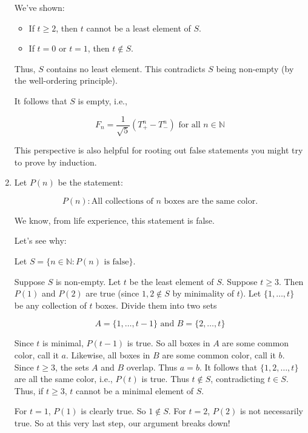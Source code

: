 \documentclass[11pt, draft]{article}
\begin{document}
\begin{enumerate}
          We've shown:
          \begin{itemize}
              \item If $t \geq 2$, then $t$ cannot be a least element of $S$.
              \item If $t = 0$ or $t = 1$, then $t \notin S$.
          \end{itemize}

          Thus, $S$ contains no least element. This contradicts $S$ being non-empty (by
          the well-ordering principle).

          It follows that $S$ is empty, i.e.,

          \[
              F_n = \frac{1}{\sqrt{5}} \left( T_+^n - T_-^n \right) \text{ for all } n \in \mathbb{N}
          \]

          This perspective is also helpful for rooting out false statements you might try
          to prove by induction.

    \item Let $P(n)$ be the statement:

          \[ P(n) : \text{All collections of } n \text{ boxes are the same color.} \]

          We know, from life experience, this statement is false.

          Let's see why:

          Let $S = \{ n \in \mathbb{N} : P(n) \text{ is false} \}$.

          Suppose $S$ is non-empty. Let $t$ be the least element of $S$. Suppose $t \geq
              3$. Then $P(1)$ and $P(2)$ are true (since $1, 2 \notin S$ by minimality of
          $t$). Let $\{1, \ldots, t\}$ be any collection of $t$ boxes. Divide them into
          two sets

          \[ A = \{1, \ldots, t-1\} \text{ and } B = \{2, \ldots, t\} \]

          Since $t$ is minimal, $P(t-1)$ is true. So all boxes in $A$ are some common
          color, call it $a$. Likewise, all boxes in $B$ are some common color, call it
          $b$. Since $t \geq 3$, the sets $A$ and $B$ overlap. Thus $a = b$. It follows
          that $\{1, 2, \ldots, t\}$ are all the same color, i.e., $P(t)$ is true. Thus
          $t \notin S$, contradicting $t \in S$. Thus, if $t \geq 3$, $t$ cannot be a
          minimal element of $S$.

          For $t = 1$, $P(1)$ is clearly true. So $1 \notin S$. For $t = 2$, $P(2)$ is
          not necessarily true. So at this very last step, our argument breaks down!
\end{enumerate}
\end{document}
